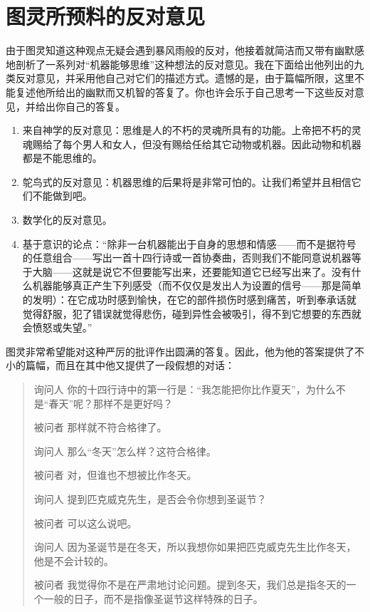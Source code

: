 \section{图灵所预料的反对意见}

由于图灵知道这种观点无疑会遇到暴风雨般的反对，他接着就简洁而又带有幽默感地剖析了一系列对“机器能够思维”这种想法的反对意见。我在下面给出他列出的九类反对意见，并采用他自己对它们的描述方式。遗憾的是，由于篇幅所限，这里不能复述他所给出的幽默而又机智的答复了。你也许会乐于自己思考一下这些反对意见，并给出你自己的答复。
\begin{enumerate}
\item 来自神学的反对意见：思维是人的不朽的灵魂所具有的功能。上帝把不朽的灵魂赐给了每个男人和女人，但没有赐给任给其它动物或机器。因此动物和机器都是不能思维的。
\item 鸵鸟式的反对意见：机器思维的后果将是非常可怕的。让我们希望并且相信它们不能做到吧。
\item 数学化的反对意见。
\item 基于意识的论点：“除非一台机器能出于自身的思想和情感——而不是据符号的任意组合——写出一首十四行诗或一首协奏曲，否则我们不能同意说机器等于大脑——这就是说它不但要能写出来，还要能知道它已经写出来了。没有什么机器能够真正产生下列感受（而不仅仅是发出人为设置的信号——那是简单的发明）：在它成功时感到愉快，在它的部件损伤时感到痛苦，听到奉承话就觉得舒服，犯了错误就觉得悲伤，碰到异性会被吸引，得不到它想要的东西就会愤怒或失望。”
\end{enumerate}
图灵非常希望能对这种严厉的批评作出圆满的答复。因此，他为他的答案提供了不小的篇幅，而且在其中他又提供了一段假想的对话：
\begin{quote}
\begin{dialogue}[labelwidth=3\ccwd,leftmargin=4\ccwd]
\item[询问人]你的十四行诗中的第一行是：“我怎能把你比作夏天”，为什么不是“春天”呢？那样不是更好吗？
\item[被问者]那样就不符合格律了。
\item[询问人]那么“冬天”怎么样？这符合格律。
\item[被问者]对，但谁也不想被比作冬天。
\item[询问人]提到匹克威克先生，是否会令你想到圣诞节？
\item[被问者]可以这么说吧。
\item[询问人]因为圣诞节是在冬天，所以我想你如果把匹克威克先生比作冬天，他是不会计较的。
\item[被问者]我觉得你不是在严肃地讨论问题。提到冬天，我们总是指冬天的一个一般的日子，而不是指像圣诞节这样特殊的日子。
\end{dialogue}
\end{quote}
